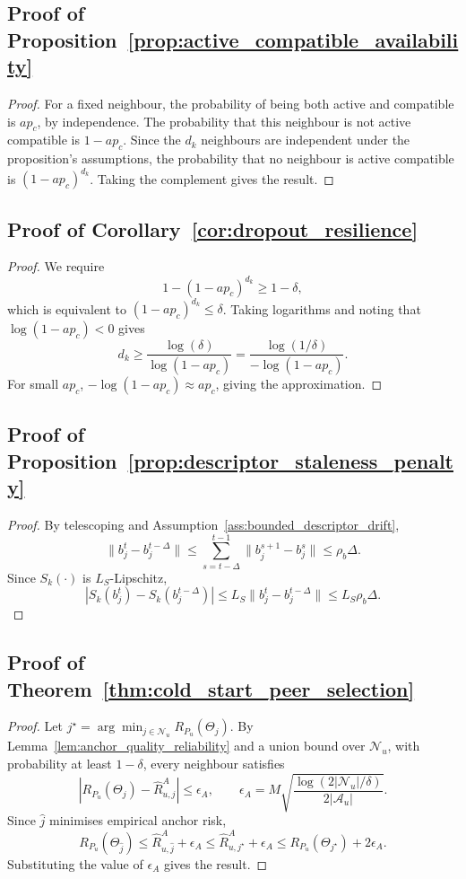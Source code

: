 \documentclass[conference]{IEEEtran}
\begin{document}
\subsection{Proof of Proposition~\ref{prop:active_compatible_availability}}
\begin{proof}
For a fixed neighbour, the probability of being both active and compatible is \(a p_c\), by independence. The probability that this neighbour is not active compatible is \(1-a p_c\). Since the \(d_k\) neighbours are independent under the proposition's assumptions, the probability that no neighbour is active compatible is \((1-a p_c)^{d_k}\). Taking the complement gives the result.
\end{proof}

\subsection{Proof of Corollary~\ref{cor:dropout_resilience}}
\begin{proof}
We require
\[
1-(1-a p_c)^{d_k}\geq1-\delta,
\]
which is equivalent to \((1-a p_c)^{d_k}\leq\delta\). Taking logarithms and noting that \(\log(1-a p_c)<0\) gives
\[
d_k
\geq
\frac{\log(\delta)}{\log(1-a p_c)}
=
\frac{\log(1/\delta)}
{-\log(1-a p_c)}.
\]
For small \(a p_c\), \(-\log(1-a p_c)\approx a p_c\), giving the approximation.
\end{proof}

\subsection{Proof of Proposition~\ref{prop:descriptor_staleness_penalty}}
\begin{proof}
By telescoping and Assumption~\ref{ass:bounded_descriptor_drift},
\[
\|b_j^t-b_j^{t-\Delta}\|
\leq
\sum_{s=t-\Delta}^{t-1}
\|b_j^{s+1}-b_j^s\|
\leq
\rho_b\Delta .
\]
Since \(S_k(\cdot)\) is \(L_S\)-Lipschitz,
\[
|S_k(b_j^t)-S_k(b_j^{t-\Delta})|
\leq
L_S\|b_j^t-b_j^{t-\Delta}\|
\leq
L_S\rho_b\Delta .
\]
\end{proof}

\subsection{Proof of Theorem~\ref{thm:cold_start_peer_selection}}
\begin{proof}
Let \(j^\star=\arg\min_{j\in\mathcal{N}_u}R_{P_u}(\Theta_j)\). By Lemma~\ref{lem:anchor_quality_reliability} and a union bound over \(\mathcal{N}_u\), with probability at least \(1-\delta\), every neighbour satisfies
\[
|R_{P_u}(\Theta_j)-\widehat{R}_{u,j}^{A}|
\leq
\epsilon_A,
\qquad
\epsilon_A
=
M
\sqrt{
\frac{\log(2|\mathcal{N}_u|/\delta)}
{2|\mathcal{A}_u|}
}.
\]
Since \(\hat{j}\) minimises empirical anchor risk,
\[
R_{P_u}(\Theta_{\hat{j}})
\leq
\widehat{R}_{u,\hat{j}}^A+\epsilon_A
\leq
\widehat{R}_{u,j^\star}^A+\epsilon_A
\leq
R_{P_u}(\Theta_{j^\star})+2\epsilon_A .
\]
Substituting the value of \(\epsilon_A\) gives the result.
\end{proof}
\end{document}
